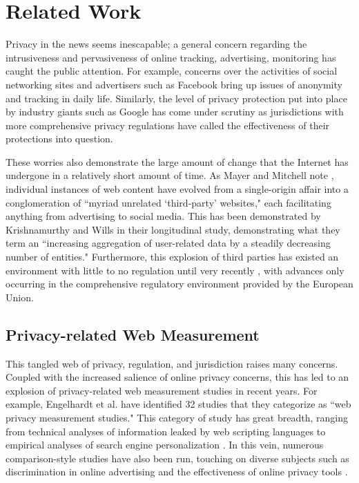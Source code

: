 \documentclass[journal]{IEEEtran}
\begin{document}
\section{Related Work}
Privacy in the news seems inescapable; a general concern regarding the intrusiveness and pervasiveness of online tracking, advertising, monitoring has caught the public attention. For example, concerns over the activities of social networking sites and advertisers such as Facebook \cite{wsj_fb} bring up issues of anonymity and tracking in daily life. Similarly, the level of privacy protection put into place by industry giants such as Google has come under scrutiny \cite{Google_EU_marketingland} as jurisdictions with more comprehensive privacy regulations have called the effectiveness of their protections into question.

These worries also demonstrate the large amount of change that the Internet has undergone in a relatively short amount of time. As Mayer and Mitchell note \cite{Mayer_Mitchell}, individual instances of web content have evolved from a single-origin affair into a conglomeration of  ``myriad unrelated  `third-party' websites," each facilitating anything from advertising to social media. 
This has been demonstrated by Krishnamurthy and Wills \cite{Krishnamurthy} in their longitudinal study, demonstrating what they term an ``increasing aggregation of user-related data by a steadily decreasing number of entities."
Furthermore, this explosion of third parties has existed an environment with little to no regulation until very recently \cite{Mayer_Mitchell}, with advances only occurring in the comprehensive regulatory environment provided by the European Union.  

\subsection{Privacy-related Web Measurement}
This tangled web of privacy, regulation, and jurisdiction raises many concerns. Coupled with the increased salience of online privacy concerns, this has led to an explosion of privacy-related web measurement studies in recent years. For example, Engelhardt et al. \cite{openwpm_article} have identified 32 studies that they categorize as ``web privacy measurement studies." This category of study has great breadth, ranging from technical analyses of information leaked by web scripting languages \cite{jang} to empirical analyses of search engine personalization \cite{hannak}.  In this vein, numerous comparison-style studies have also been run, touching on diverse subjects such as discrimination in online advertising \cite{sweeney} and the effectiveness of online privacy tools \cite{balebako}.
\end{document}
